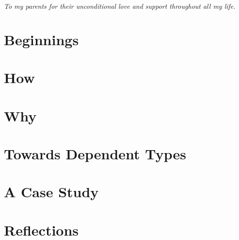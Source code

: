 \documentclass[oneside]{book}
\begin{document}
\clearpage
\tableofcontents
\clearpage
\textit{To my parents for their unconditional love and support throughout all my life.}
\clearpage



\epigraphhead[450]{}
\part{Beginnings}









\epigraphhead[450]{}
\part{How}






\epigraphhead[450]{}
\part{Why}




\epigraphhead[450]{}
\part{Towards Dependent Types}


\epigraphhead[450]{}
\part{A Case Study}


\epigraphhead[450]{}
\part{Reflections}




\renewcommand\bibname{References}





\end{document}

